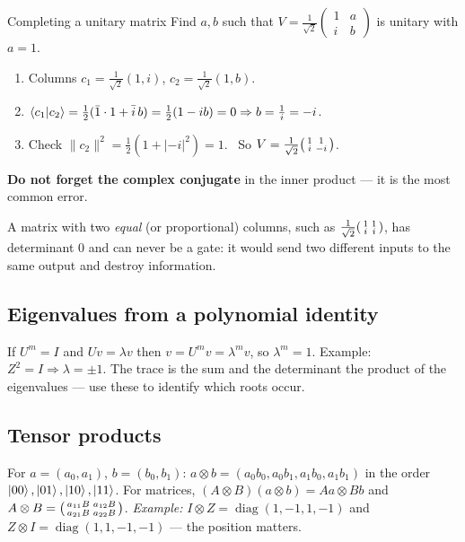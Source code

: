 \documentclass[11pt,a4paper,openany]{book}
\newcounter{wex}[chapter]
\newenvironment{steps}{\begin{enumerate}[label=\textbf{Step \arabic*.}, leftmargin=4.2em, itemsep=2pt]}{\end{enumerate}}
\begin{document}
\begin{wexample}{Completing a unitary matrix}
Find $a, b$ such that $V = \frac{1}{\sqrt2}\begin{pmatrix}1 & a\\ i & b\end{pmatrix}$ is unitary with $a = 1$.
\begin{steps}
\item Columns $c_1 = \frac{1}{\sqrt2}(1, i)$, $c_2 = \frac{1}{\sqrt2}(1, b)$.
\item $\braket{c_1|c_2} = \frac12(\bar1\cdot1 + \bar i\, b) = \frac12(1 - ib) = 0 \Rightarrow b = \frac1i = -i$.
\item Check $\|c_2\|^2 = \frac12(1 + |{-i}|^2) = 1$. \checkmark\ So $V = \frac{1}{\sqrt2}\begin{psmallmatrix}1&1\\ i&-i\end{psmallmatrix}$.
\end{steps}
\textbf{Do not forget the complex conjugate} in the inner product --- it is the most common error.
\end{wexample}

\begin{trap}
A matrix with two \emph{equal} (or proportional) columns, such as $\frac{1}{\sqrt2}\begin{psmallmatrix}1&1\\ i&i\end{psmallmatrix}$, has determinant 0 and can never be a gate:
it would send two different inputs to the same output and destroy information.
\end{trap}

\subsection{Eigenvalues from a polynomial identity}
If $U^m = I$ and $Uv = \lambda v$ then $v = U^m v = \lambda^m v$, so $\lambda^m = 1$. Example: $Z^2 = I \Rightarrow \lambda = \pm1$.
The trace is the sum and the determinant the product of the eigenvalues --- use these to identify which roots
occur.

\subsection{Tensor products}
For $a = (a_0, a_1)$, $b = (b_0, b_1)$: $a\otimes b = (a_0b_0, a_0b_1, a_1b_0, a_1b_1)$ in the order $\ket{00},\ket{01},\ket{10},\ket{11}$.
For matrices, $(A\otimes B)(a\otimes b) = Aa\otimes Bb$ and
$A\otimes B = \begin{psmallmatrix}a_{11}B & a_{12}B\\ a_{21}B & a_{22}B\end{psmallmatrix}$.
\emph{Example:} $I\otimes Z = \operatorname{diag}(1,-1,1,-1)$ and $Z\otimes I = \operatorname{diag}(1,1,-1,-1)$ --- the position matters.
\end{document}
